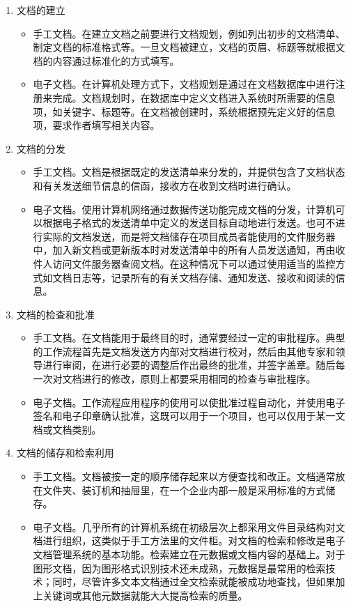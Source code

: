     \begin{enumerate}
    \item 文档的建立
        \begin{itemize}
            \item  手工文档。在建立文档之前要进行文档规划，例如列出初步的文档清单、制定文档的标准格式等。一旦文档被建立，文档的页眉、标题等就根据文档的内容通过标准化的方式填写。
            \item  电子文档。在计算机处理方式下，文档规划是通过在文档数据库中进行注册来完成。文档规划时，在数据库中定义文档进入系统时所需要的信息项，如关键字、标题等。在文档被创建时，系统根据预先定义好的信息项，要求作者填写相关内容。
        \end{itemize}

    \item 文档的分发
        \begin{itemize}
            \item  手工文档。文档是根据既定的发送清单来分发的，并提供包含了文档状态和有关发送细节信息的信函，接收方在收到文档时进行确认。
            \item  电子文档。使用计算机网络通过数据传送功能完成文档的分发，计算机可以根据电子格式的发送清单中定义的发送目标自动地进行发送。也可不进行实际的文档发送，而是将文档储存在项目成员者能使用的文件服务器中，加入新文档或更新版本时对发送清单中的所有人员发送通知，再由收件人访问文件服务器查阅文档。在这种情况下可以通过使用适当的监控方式如文档日志等，记录所有的有关文档存储、通知发送、接收和阅读的信息。
        \end{itemize}

    \item 文档的检查和批准
        \begin{itemize}
            \item  手工文档。在文档能用于最终目的时，通常要经过一定的审批程序。典型的工作流程首先是文档发送方内部对文档进行校对，然后由其他专家和领导进行审阅，在进行必要的调整后作出最终的批准，并签字盖章。随后每一次对文档进行的修改，原则上都要采用相同的检查与审批程序。
            \item  电子文档。工作流程应用程序的使用可以使批准过程自动化，并使用电子签名和电子印章确认批准，这既可以用于一个项目，也可以仅用于某一文档或文档类别。
        \end{itemize}

    \item 文档的储存和检索利用
        \begin{itemize}
            \item  手工文档。文档被按一定的顺序储存起来以方便查找和改正。文档通常放在文件夹、装订机和抽屉里，在一个企业内部一般是采用标准的方式储存。
            \item  电子文档。几乎所有的计算机系统在初级层次上都采用文件目录结构对文档进行组织，这类似于手工方法里的文件柜。对文档的检索和修改是电子文档管理系统的基本功能。检索建立在元数据或文档内容的基础上。对于图形文档，因为图形格式识别技术还未成熟，元数据是最常用的检索技术；同时，尽管许多文本文档通过全文检索就能被成功地查找，但如果加上关键词或其他元数据就能大大提高检索的质量。
        \end{itemize}


\end{enumerate}
